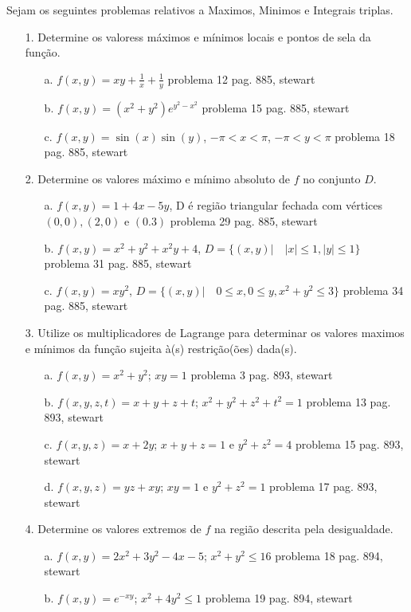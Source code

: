 Sejam os seguintes problemas relativos a Maximos, Minimos e Integrais triplas.


\begin{itemize}
	\item[1.] Determine os valoress máximos e mínimos locais e pontos de sela da função. 
	\begin{itemize}
	\item[a.] $f(x,y)=xy+\frac{1}{x}+\frac{1}{y}$
	problema 12 pag. 885, stewart	
	\item[b.] $f(x,y)=(x^{2}+y^{2})e^{y^{2}-x^{2}}$
	problema 15 pag. 885, stewart	
    \item[c.] $f(x,y)=\sin (x) \sin(y)$, $-\pi<x<\pi$, $-\pi<y<\pi$
	problema 18 pag. 885, stewart
    \end{itemize}	
\end{itemize}
\begin{itemize}
	\item[2.] Determine os valores máximo e mínimo absoluto de $f$ no conjunto $D$.   
	\begin{itemize}
		\item[a.] $f(x,y)=1+4x-5y$, D é região triangular fechada com vértices $(0,0), (2,0)$ e $(0.3)$
		problema 29 pag. 885, stewart	
		\item[b.] $f(x,y)=x^{2}+y^{2}+x^{2}y+4$, $D=\{(x,y)| \quad |x|\leqslant 1, |y|\leqslant 1 \}$
		problema 31 pag. 885, stewart
		\item[c.] $f(x,y)=xy^{2}$, $D=\{(x,y)| \quad 0\leqslant x, 0\leqslant y, x^{2}+y^{2}\leqslant3 \}$
		problema 34 pag. 885, stewart		
	\end{itemize}
\end{itemize}
\begin{itemize}
	\item[3.] Utilize os multiplicadores de Lagrange para determinar os valores maximos e mínimos da função sujeita à(s) restrição(ões) dada(s).
	\begin{itemize}
	\item[a.] $f(x,y)=x^{2}+y^{2}$; $xy=1$
	problema 3 pag. 893, stewart	
	\item[b.] $f(x,y,z,t)=x+y+z+t$; $x^{2}+y^{2}+z^{2}+t^{2}=1$
	problema 13 pag. 893, stewart	
	\item[c.] $f(x,y,z)=x+2y$; $x+y+z=1$ e $y^{2}+z^{2}=4$
	problema 15 pag. 893, stewart	
	\item[d.] $f(x,y,z)=yz+xy$; $xy=1$ e $y^{2}+z^{2}=1$
	problema 17 pag. 893, stewart
    \end{itemize}
\end{itemize}
\begin{itemize}
	\item[4.] Determine os valores extremos de $f$ na região descrita pela desigualdade.
	\begin{itemize}
		\item[a.] $f(x,y)=2x^{2}+3y^{2}-4x-5$; $x^{2}+y^{2}\leqslant 16$
		problema 18 pag. 894, stewart	
		\item[b.] $f(x,y)=e^{-xy}$; $x^{2}+4y^{2}\leqslant 1$
     	problema 19 pag. 894, stewart		
	\end{itemize}
\end{itemize}

